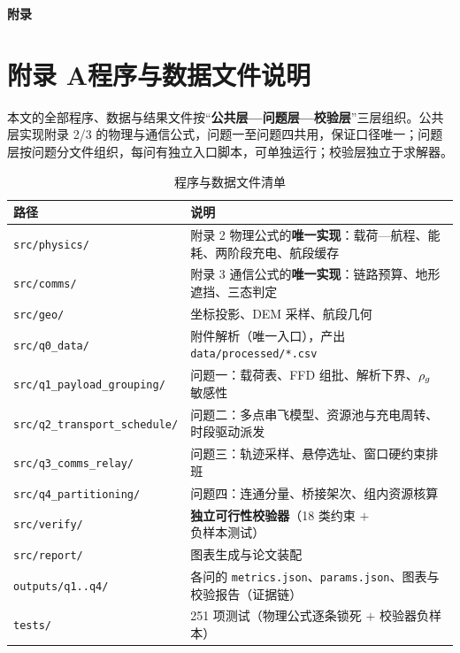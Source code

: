 \newpage
\appendix
\begin{center}
	{\bfseries 附\quad 录}
\end{center}

\section*{附录 A\quad 程序与数据文件说明}

本文的全部程序、数据与结果文件按“\textbf{公共层—问题层—校验层}”三层组织。公共层实现附录 2/3 的物理与通信公式，问题一至问题四共用，保证口径唯一；问题层按问题分文件组织，每问有独立入口脚本，可单独运行；校验层独立于求解器。

\begin{table}[htbp]
	\caption{程序与数据文件清单}
	\label{tab:files}
	\centering
	\begin{tabular}{p{6.2cm}p{8.4cm}}
		\toprule
		路径 & 说明 \\
		\midrule
		\texttt{src/physics/} & 附录 2 物理公式的\textbf{唯一实现}：载荷—航程、能耗、两阶段充电、航段缓存 \\
		\texttt{src/comms/}   & 附录 3 通信公式的\textbf{唯一实现}：链路预算、地形遮挡、三态判定 \\
		\texttt{src/geo/}     & 坐标投影、DEM 采样、航段几何 \\
		\texttt{src/q0\_data/} & 附件解析（唯一入口），产出 \texttt{data/processed/*.csv} \\
		\texttt{src/q1\_payload\_grouping/} & 问题一：载荷表、FFD 组批、解析下界、$\rho_{g}$ 敏感性 \\
		\texttt{src/q2\_transport\_schedule/} & 问题二：多点串飞模型、资源池与充电周转、时段驱动派发 \\
		\texttt{src/q3\_comms\_relay/} & 问题三：轨迹采样、悬停选址、窗口硬约束排班 \\
		\texttt{src/q4\_partitioning/} & 问题四：连通分量、桥接架次、组内资源核算 \\
		\texttt{src/verify/} & \textbf{独立可行性校验器}（18 类约束 $+$ 负样本测试） \\
		\texttt{src/report/} & 图表生成与论文装配 \\
		\texttt{outputs/q1..q4/} & 各问的 \texttt{metrics.json}、\texttt{params.json}、图表与校验报告（证据链） \\
		\texttt{tests/} & 251 项测试（物理公式逐条锁死 $+$ 校验器负样本） \\
		\bottomrule
	\end{tabular}
\end{table}

